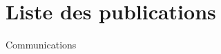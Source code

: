 %
%

\chapter*{Liste des publications}
\label{sec:publications}
\vspace*{-10mm}

\begin{refsegment}

\nocite{DGCI2013,Coeurjolly2013Implementation,AFIG2013,CVIU2014,DGCI2014,SMI2015,PosterSIGGRAPH2015,ChapterIICurvature}
\printbibliography[heading=none,segment=\therefsegment]

\end{refsegment}
\clearpage


\vspace*{22mm}
{Communications}
\label{sec:communications}
\vspace*{5mm}

